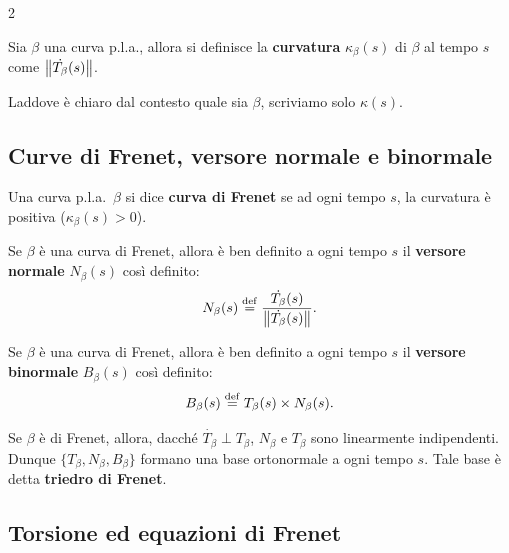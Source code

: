 \begin{multicols*}{2}
    \begin{definition}[Curvatura]
        Sia $\beta$ una curva p.l.a., allora si definisce la
        \textbf{curvatura} $\kappa_\beta(s)$ di $\beta$ al tempo $s$ come
        $\left\lVert \dot{T_\beta}(s) \right\rVert$. \smallskip

        Laddove è chiaro dal contesto quale sia $\beta$, scriviamo solo $\kappa(s)$.
    \end{definition}

    \subsection{Curve di Frenet, versore normale e binormale}

    \begin{definition}
        Una curva p.l.a.~$\beta$ si dice \textbf{curva di Frenet} se
        ad ogni tempo $s$, la curvatura è positiva ($\kappa_\beta(s) > 0$).
    \end{definition}

    \begin{definition}
        Se $\beta$ è una curva di Frenet, allora è ben definito
        a ogni tempo $s$ il \textbf{versore normale} $N_\beta(s)$ così
        definito:
        \[
            N_\beta(s) \overset{\mathrm{def}}{=} \frac{\dot{T_\beta}(s)}{\left\lVert \dot{T_\beta}(s) \right\rVert}.
        \]
    \end{definition}

    \begin{definition}
        Se $\beta$ è una curva di Frenet, allora è ben definito
        a ogni tempo $s$ il \textbf{versore binormale} $B_\beta(s)$ così
        definito:
        \[
            B_\beta(s) \overset{\mathrm{def}}{=} T_\beta(s) \times N_\beta(s).
        \]
    \end{definition}

    \begin{remark}
        Se $\beta$ è di Frenet, allora, dacché $\dot{T_\beta} \perp T_\beta$,
        $N_\beta$ e $T_\beta$ sono linearmente indipendenti. Dunque
        $\{T_\beta, N_\beta, B_\beta\}$ formano una base ortonormale a ogni tempo
        $s$. Tale base è detta \textbf{triedro di Frenet}.
    \end{remark}

    \subsection{Torsione ed equazioni di Frenet}


\end{multicols*}
